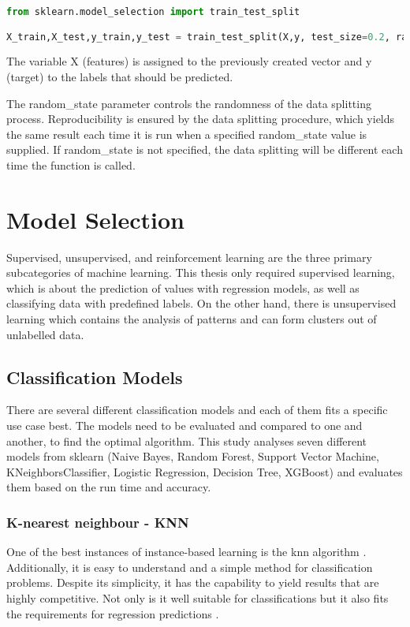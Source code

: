 \begin{lstlisting}[language=Python, caption=Train-Test-Split in Python \citep{sklearn_ttt}, label=lst:train-test-split]
from sklearn.model_selection import train_test_split

X_train,X_test,y_train,y_test = train_test_split(X,y, test_size=0.2, random_state=42)
\end{lstlisting}

The variable X (features) is assigned to the previously created vector and y (target) to the labels that should be predicted. 

The random\_state parameter controls the randomness of the data splitting process. Reproducibility is ensured by the data splitting procedure, which yields the same result each time it is run when a specified random\_state value is supplied. If random\_state is not specified, the data splitting will be different each time the function is called.

\section{Model Selection}

Supervised, unsupervised, and reinforcement learning are the three primary subcategories of machine learning. This thesis only required supervised learning, which is about the prediction of values with regression models, as well as classifying data with predefined labels. On the other hand, there is unsupervised learning which contains the analysis of patterns and can form clusters out of unlabelled data.

\subsection{Classification Models}

There are several different classification models and each of them fits a specific use case best. 
The models need to be evaluated and compared to one and another, to find the optimal algorithm. This study analyses seven different models from sklearn (Naive Bayes, Random Forest, Support Vector Machine, KNeighborsClassifier, Logistic Regression, Decision Tree, XGBoost) and evaluates them based on the run time and accuracy. 

\subsubsection{K-nearest neighbour - KNN}
One of the best instances of instance-based learning is the \ac{knn} algorithm \citep{sen_supervised_2020}. Additionally, it is easy to understand and a simple method for classification problems. Despite its simplicity, it has the capability to yield results that are highly competitive. Not only is it well suitable for classifications but it also fits the requirements for regression predictions \citep{sen_supervised_2020}.

